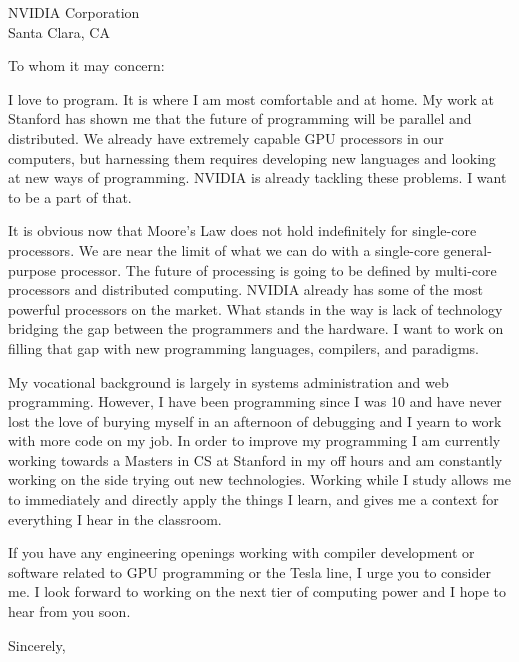 \documentclass{letter}[11pt]
\begin{document}
\begin{letter}{NVIDIA Corporation\\
Santa Clara, CA
}

\opening{To whom it may concern:}

I love to program.  It is where I am most comfortable and at home.  My work at Stanford has shown me that the future of programming will be parallel and distributed.  We already have extremely capable GPU processors in our computers, but harnessing them requires developing new languages and looking at new ways of programming. NVIDIA is already tackling these problems.  I want to be a part of that.

It is obvious now that Moore's Law does not hold indefinitely for single-core processors.  We are near the limit of what we can do with a single-core general-purpose processor.  The future of processing is going to be defined by multi-core processors and distributed computing.  NVIDIA already has some of the most powerful processors on the market.  What stands in the way is lack of technology bridging the gap between the programmers and the hardware.  I want to work on filling that gap with new programming languages, compilers, and paradigms.

My vocational background is largely in systems administration and web programming.  However, I have been programming since I was 10 and have never lost the love of burying myself in an afternoon of debugging and I yearn to work with more code on my job.  In order to improve my programming I am currently working towards a Masters in CS at Stanford in my off hours and am constantly working on the side trying out new technologies.  Working while I study allows me to immediately and directly apply the things I learn, and gives me a context for everything I hear in the classroom.

If you have any engineering openings working with compiler development or software related to GPU programming or the Tesla line, I urge you to consider me.  I look forward to working on the next tier of computing power and I hope to hear from you soon.

\closing{Sincerely,}
\end{letter}
\end{document}
